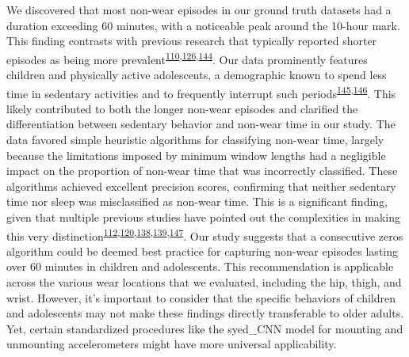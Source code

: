 \documentclass[
  10pt,
]{scrbook}
\begin{document}
We discovered that most non-wear episodes in our ground truth datasets
had a duration exceeding 60 minutes, with a noticeable peak around the
10-hour mark. This finding contrasts with previous research that
typically reported shorter episodes as being more
prevalent\textsuperscript{\protect\hyperlink{ref-aadland_comparison_2018}{110},\protect\hyperlink{ref-jaeschke_variability_2018}{126},\protect\hyperlink{ref-hutto_identifying_2013}{144}}.
Our data prominently features children and physically active
adolescents, a demographic known to spend less time in sedentary
activities and to frequently interrupt such
periods\textsuperscript{\protect\hyperlink{ref-cooper_objectively_2015}{145},\protect\hyperlink{ref-kwon_breaks_2012}{146}}.
This likely contributed to both the longer non-wear episodes and
clarified the differentiation between sedentary behavior and non-wear
time in our study. The data favored simple heuristic algorithms for
classifying non-wear time, largely because the limitations imposed by
minimum window lengths had a negligible impact on the proportion of
non-wear time that was incorrectly classified. These algorithms achieved
excellent precision scores, confirming that neither sedentary time nor
sleep was misclassified as non-wear time. This is a significant finding,
given that multiple previous studies have pointed out the complexities
in making this very
distinction\textsuperscript{\protect\hyperlink{ref-duncan_wear-time_2018}{112},\protect\hyperlink{ref-doherty_large_2017}{120},\protect\hyperlink{ref-troiano_physical_2008}{138},\protect\hyperlink{ref-choi_validation_2011}{139},\protect\hyperlink{ref-barouni_ambulatory_2020}{147}}.
Our study suggests that a consecutive zeros algorithm could be deemed
best practice for capturing non-wear episodes lasting over 60 minutes in
children and adolescents. This recommendation is applicable across the
various wear locations that we evaluated, including the hip, thigh, and
wrist. However, it's important to consider that the specific behaviors
of children and adolescents may not make these findings directly
transferable to older adults. Yet, certain standardized procedures like
the syed\_CNN model for mounting and unmounting accelerometers might
have more universal applicability.
\end{document}
